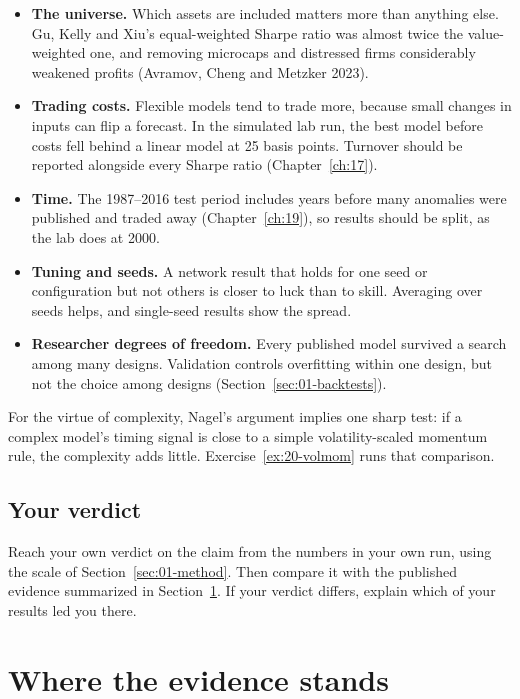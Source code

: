 \begin{itemize}
  \item \textbf{The universe.} Which assets are included matters more than anything else. Gu, Kelly and Xiu's equal-weighted Sharpe ratio was almost twice the value-weighted one, and removing microcaps and distressed firms considerably weakened profits (Avramov, Cheng and Metzker 2023).
  \item \textbf{Trading costs.} Flexible models tend to trade more, because small changes in inputs can flip a forecast. In the simulated lab run, the best model before costs fell behind a linear model at 25 basis points. Turnover should be reported alongside every Sharpe ratio (Chapter~\ref{ch:17}).
  \item \textbf{Time.} The 1987--2016 test period includes years before many anomalies were published and traded away (Chapter~\ref{ch:19}), so results should be split, as the lab does at 2000.
  \item \textbf{Tuning and seeds.} A network result that holds for one seed or configuration but not others is closer to luck than to skill. Averaging over seeds helps, and single-seed results show the spread.
  \item \textbf{Researcher degrees of freedom.} Every published model survived a search among many designs. Validation controls overfitting within one design, but not the choice among designs (Section~\ref{sec:01-backtests}).
\end{itemize}

For the virtue of complexity, Nagel's argument implies one sharp test: if a complex model's timing signal is close to a simple volatility-scaled momentum rule, the complexity adds little. Exercise~\ref{ex:20-volmom} runs that comparison.

\subsection*{Your verdict}

Reach your own verdict on the claim from the numbers in your own run, using the scale of Section~\ref{sec:01-method}. Then compare it with the published evidence summarized in Section~\ref{sec:20-verdict}. If your verdict differs, explain which of your results led you there.

\section{Where the evidence stands}
\label{sec:20-verdict}

